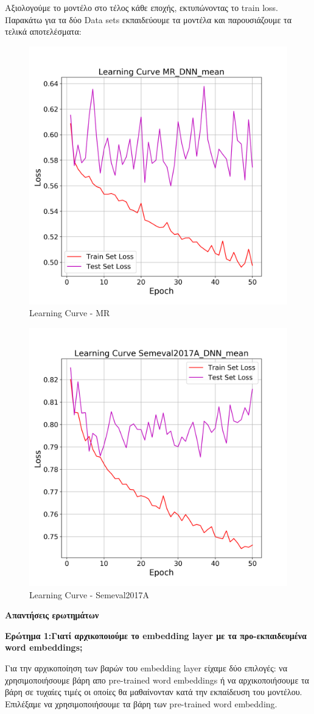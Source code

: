 \documentclass[12pt]{article}
\begin{document}
Αξιολογούμε το μοντέλο στο τέλος κάθε εποχής, εκτυπώνοντας το train loss. Παρακάτω για τα δύο Data sets εκπαιδεύουμε τα μοντέλα και παρουσιάζουμε τα τελικά αποτελέσματα: 

\begin{figure}[h!]
	\centering
	\includegraphics[width=0.5\linewidth]{./img/MR/DNN_mean_loss}
	\caption{Learning Curve - MR}
	\label{fig:sin}
\end{figure}


\begin{figure}[h!]
	\centering
	\includegraphics[width=0.5\linewidth]{./img/Semeval2017A/DNN_mean_loss}
	\caption{Learning Curve - Semeval2017A}
	\label{fig:sin}
\end{figure}




\textbf{Απαντήσεις ερωτημάτων}

\textbf{Ερώτημα 1:Γιατί αρχικοποιούμε το embedding layer με τα προ-εκπαιδευμένα word embeddings;}

Για την αρχικοποίηση των βαρών του embedding layer είχαμε δύο επιλογές: να χρησιμοποιήσουμε βάρη απο pre-trained word embeddings ή να αρχικοποιήσουμε τα βάρη σε τυχαίες τιμές οι οποίες θα μαθαίνονταν κατά την εκπαίδευση του μοντέλου. Επιλέξαμε να χρησιμοποιήσουμε τα βάρη των pre-trained word embedding. 
\end{document}
